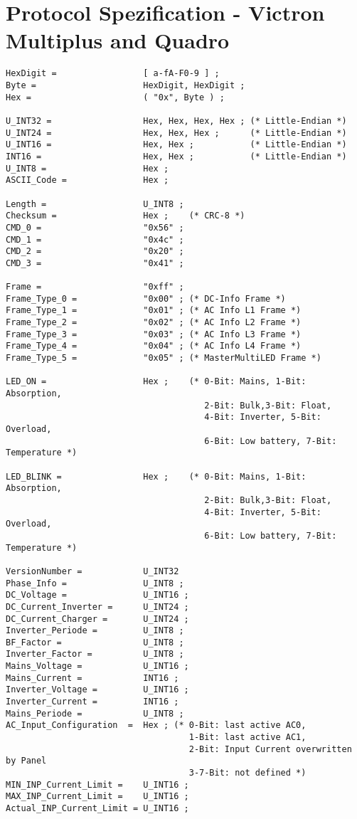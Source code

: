 \section{Protocol Spezification - Victron Multiplus and Quadro}
\label{VICTRONMULTIQUADEBNF}
\begin{verbatim}
HexDigit =                 [ a-fA-F0-9 ] ;
Byte =                     HexDigit, HexDigit ;
Hex =                      ( "0x", Byte ) ;

U_INT32 =                  Hex, Hex, Hex, Hex ; (* Little-Endian *)
U_INT24 =                  Hex, Hex, Hex ;      (* Little-Endian *)
U_INT16 =                  Hex, Hex ;           (* Little-Endian *)
INT16 =                    Hex, Hex ;           (* Little-Endian *)
U_INT8 =                   Hex ;
ASCII_Code =               Hex ;

Length =                   U_INT8 ;
Checksum =                 Hex ;    (* CRC-8 *)
CMD_0 =                    "0x56" ;
CMD_1 =                    "0x4c" ;
CMD_2 =                    "0x20" ;
CMD_3 =                    "0x41" ;

Frame =                    "0xff" ;
Frame_Type_0 =             "0x00" ; (* DC-Info Frame *)
Frame_Type_1 =             "0x01" ; (* AC Info L1 Frame *)
Frame_Type_2 =             "0x02" ; (* AC Info L2 Frame *)
Frame_Type_3 =             "0x03" ; (* AC Info L3 Frame *)
Frame_Type_4 =             "0x04" ; (* AC Info L4 Frame *)
Frame_Type_5 =             "0x05" ; (* MasterMultiLED Frame *)

LED_ON =                   Hex ;    (* 0-Bit: Mains, 1-Bit: Absorption,
                                       2-Bit: Bulk,3-Bit: Float, 
                                       4-Bit: Inverter, 5-Bit: Overload, 
                                       6-Bit: Low battery, 7-Bit: Temperature *)

LED_BLINK =                Hex ;    (* 0-Bit: Mains, 1-Bit: Absorption,
                                       2-Bit: Bulk,3-Bit: Float, 
                                       4-Bit: Inverter, 5-Bit: Overload, 
                                       6-Bit: Low battery, 7-Bit: Temperature *)

VersionNumber =            U_INT32
Phase_Info =               U_INT8 ;
DC_Voltage =               U_INT16 ;
DC_Current_Inverter =      U_INT24 ;
DC_Current_Charger =       U_INT24 ;
Inverter_Periode =         U_INT8 ;
BF_Factor =                U_INT8 ;
Inverter_Factor =          U_INT8 ;
Mains_Voltage =            U_INT16 ;
Mains_Current =            INT16 ;
Inverter_Voltage =         U_INT16 ;
Inverter_Current =         INT16 ;
Mains_Periode =            U_INT8 ;
AC_Input_Configuration  =  Hex ; (* 0-Bit: last active AC0, 
                                    1-Bit: last active AC1, 
                                    2-Bit: Input Current overwritten by Panel
                                    3-7-Bit: not defined *)
MIN_INP_Current_Limit =    U_INT16 ;
MAX_INP_Current_Limit =    U_INT16 ;
Actual_INP_Current_Limit = U_INT16 ; 


\end{verbatim}
